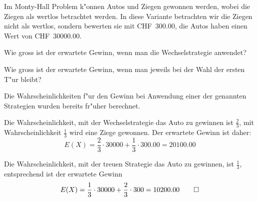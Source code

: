 Im Monty-Hall Problem k"onnen Autos und Ziegen gewonnen werden, wobei
die Ziegen als wertlos betrachtet werden. In diese Variante betrachten
wir die Ziegen nicht als wertlos, sondern bewerten sie mit CHF~300.00,
die Autos haben einen Wert von CHF~30000.00.
\begin{teilaufgaben}
\item Wie gross ist der erwartete Gewinn, wenn man die Wechselstrategie
anwendet?
\item Wie gross ist der erwartete Gewinn, wenn man jeweils bei der Wahl
der ersten T"ur bleibt?
\end{teilaufgaben}

\begin{loesung}
Die Wahrscheinlichkeiten f"ur den Gewinn bei Anwendung einer der
genannten Strategien wurden bereits fr"uher berechnet.
\begin{teilaufgaben}
\item
Die Wahrscheinlichkeit, mit der Wechselstrategie das Auto zu gewinnen
ist $\frac23$, mit Wahrscheinlichkeit $\frac13$ wird eine Ziege gewonnen.
Der erwartete Gewinn ist daher:
\[
E(X)=\frac23\cdot 30000+\frac13\cdot 300.00=20100.00
\]
\item
Die Wahrscheinlichkeit, mit der treuen Strategie das Auto zu
gewinnen, ist $\frac13$, entsprechend ist der erwartete Gewinn
\[
E(X)=\frac13\cdot 30000+\frac23\cdot 300=10200.00
\qedhere
\]
\end{teilaufgaben}
\end{loesung}

